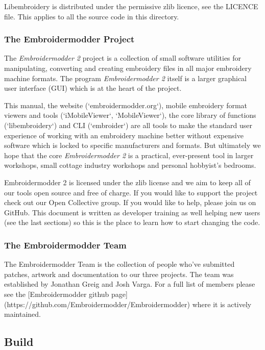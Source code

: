 \documentclass[a4paper, 11pt]{report}
\begin{document}
Libembroidery is distributed under the permissive zlib licence, see the 
LICENCE file. This applies to all the source code in this directory.

\subsubsection{The Embroidermodder Project}

The \textit{Embroidermodder 2} project is a collection of small software utilities for
manipulating, converting and creating embroidery files in all major embroidery
machine formats. The program \textit{Embroidermodder 2} itself is a larger graphical
user interface (GUI) which is at the heart of the project.

This manual, the website (`embroidermodder.org`), mobile embroidery format viewers
and tools (`iMobileViewer`, `MobileViewer`), the core library of functions
(`libembroidery`) and CLI (`embroider`) are all tools to make the standard
user experience of working with an embroidery machine better without expensive
software which is locked to specific manufacturers and formats. But ultimately
we hope that the core \textit{Embroidermodder 2} is a practical, ever-present tool in
larger workshops, small cottage industry workshops and personal hobbyist's
bedrooms.

Embroidermodder 2 is licensed under the zlib license and we aim to keep all of
our tools open source and free of charge. If you would like to support the
project check out our Open Collective group. If you would like to help, please
join us on GitHub. This document is written as developer training as well
helping new users (see the last sections) so this is the place to learn how
to start changing the code.

\subsubsection{The Embroidermodder Team}

The Embroidermodder Team is the collection of people who've submitted
patches, artwork and documentation to our three projects.
The team was established by Jonathan Greig and Josh Varga.
For a full list of members please see the
[Embroidermodder github page](https://github.com/Embroidermodder/Embroidermodder)
where it is actively maintained.

\subsection{Build}
\end{document}
